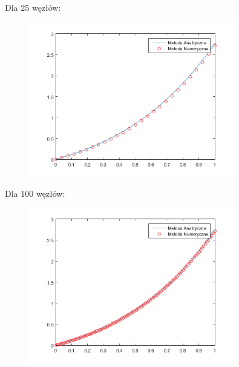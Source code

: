 \begin{samepage}
	Dla 25 węzłów:
	
	\FloatBarrier
	\begin{figure}[!ht]
		\begin{center}
			\includegraphics[width=0.8\textwidth]{Lab4/charts/zad4/b/25.png}
		\end{center}
	\end{figure}
	\FloatBarrier
\end{samepage}

\newpage

\begin{samepage}
	Dla 100 węzłów:
	
	\FloatBarrier
	\begin{figure}[!ht]
		\begin{center}
			\includegraphics[width=0.8\textwidth]{Lab4/charts/zad4/b/100.png}
		\end{center}
	\end{figure}
	\FloatBarrier
\end{samepage}

